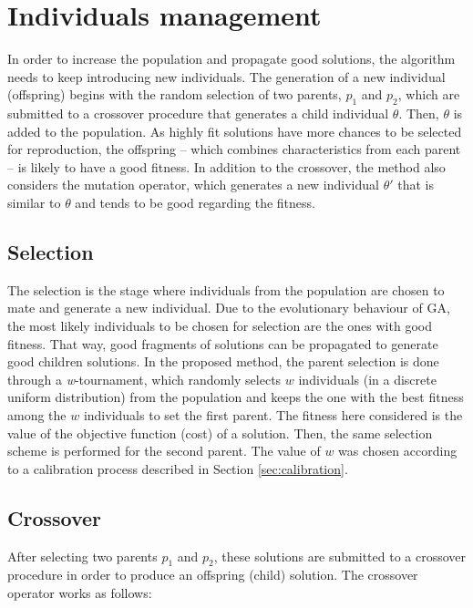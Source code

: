 \section{Individuals management}
\label{individuals-management}
In order to increase the population and propagate good solutions, the algorithm needs to keep introducing new individuals. The generation of a new individual (offspring) begins with the random selection of two parents, $p_1$ and $p_2$, which are submitted to a crossover procedure that generates a child individual $\theta$. Then, $\theta$ is added to the population. As highly fit solutions have more chances to be selected for reproduction, the offspring -- which combines characteristics from each parent -- is likely to have a good fitness. In addition to the crossover, the method also considers the mutation operator, which generates a new individual $\theta'$ that is similar to $\theta$ and tends to be good regarding the fitness.

\subsection{Selection}
\label{subsec:selection}
The selection is the stage where individuals from the population are chosen to mate and generate a new individual. Due to the evolutionary behaviour of GA, the most likely individuals to be chosen for selection are the ones with good fitness. That way, good fragments of solutions can be propagated to generate good children solutions. In the proposed method, the parent selection is done through a \textit{w}-tournament, which randomly selects $w$ individuals (in a discrete uniform distribution) from the population and keeps the one with the best fitness among the $w$ individuals to set the first parent. The fitness here considered is the value of the objective function (cost) of a solution. Then, the same selection scheme is performed for the second parent. The value of $w$ was chosen according to a calibration process described in Section \ref{sec:calibration}.

\subsection{Crossover}
\label{subsec:crossover}
After selecting two parents $p_1$ and $p_2$, these solutions are submitted to a crossover procedure in order to produce an offspring (child) solution. The crossover operator works as follows:

